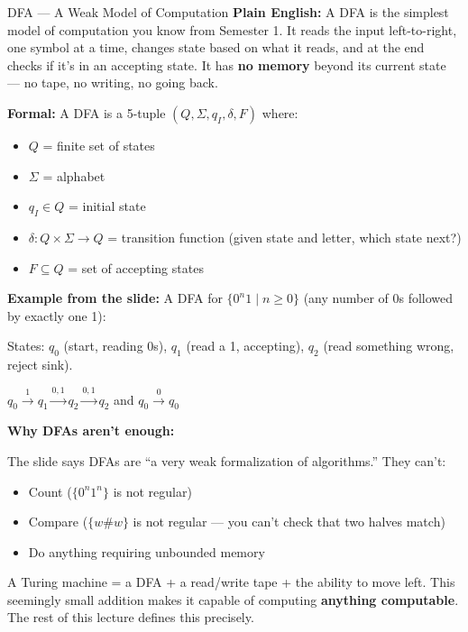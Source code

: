\documentclass[11pt,a4paper]{article}
\newcommand{\kt}[1]{\par\vspace{0.3em}\colorbox{yellow!60}{\parbox{\dimexpr\linewidth-2\fboxsep}{#1}}\vspace{0.3em}}
\begin{document}
\begin{definitionbox}{DFA --- A Weak Model of Computation}
\textbf{Plain English:} A DFA is the simplest model of computation you know from Semester 1. It reads the input left-to-right, one symbol at a time, changes state based on what it reads, and at the end checks if it's in an accepting state. It has \textbf{no memory} beyond its current state --- no tape, no writing, no going back.

\textbf{Formal:} A DFA is a 5-tuple $(Q, \Sigma, q_I, \delta, F)$ where:
\begin{itemize}[nosep]
\item $Q$ = finite set of states
\item $\Sigma$ = alphabet
\item $q_I \in Q$ = initial state
\item $\delta\colon Q \times \Sigma \to Q$ = transition function (given state and letter, which state next?)
\item $F \subseteq Q$ = set of accepting states
\end{itemize}

\textbf{Example from the slide:} A DFA for $\{0^n 1 \mid n \geq 0\}$ (any number of 0s followed by exactly one 1):

States: $q_0$ (start, reading 0s), $q_1$ (read a 1, accepting), $q_2$ (read something wrong, reject sink).
\begin{center}
$q_0 \xrightarrow{1} q_1 \xrightarrow{0,1} q_2 \xrightarrow{0,1} q_2$ \quad and \quad $q_0 \xrightarrow{0} q_0$
\end{center}

\textbf{Why DFAs aren't enough:}

The slide says DFAs are ``a very weak formalization of algorithms.'' They can't:
\begin{itemize}[nosep]
\item Count ($\{0^n 1^n\}$ is not regular)
\item Compare ($\{w\#w\}$ is not regular --- you can't check that two halves match)
\item Do anything requiring unbounded memory
\end{itemize}

\kt{A Turing machine = a DFA + a read/write tape + the ability to move left. This seemingly small addition makes it capable of computing \textbf{anything computable}. The rest of this lecture defines this precisely.}
\end{definitionbox}
\end{document}
